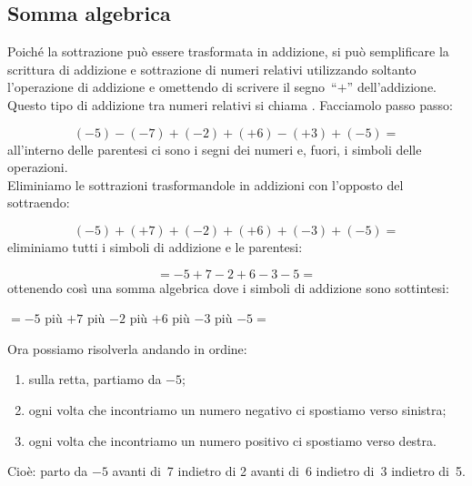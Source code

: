 \subsection{Somma algebrica}

Poiché la sottrazione può essere trasformata in addizione, si può 
semplificare la scrittura di addizione e sottrazione di numeri relativi 
utilizzando soltanto l'operazione di addizione e omettendo di scrivere
il segno~``\(+\)'' dell'addizione. 
Questo tipo di addizione tra numeri relativi si chiama .
Facciamolo passo passo:

\vspace{-1em}
\[(-5)-(-7)+(-2)+(+6)-(+3)+(-5) =\]
all'interno delle parentesi ci sono i segni dei numeri e, fuori, i simboli 
delle operazioni.\\
Eliminiamo le sottrazioni trasformandole in addizioni 
con l'opposto del sottraendo:

\vspace{-1em}
\[(-5)+(+7)+(-2)+(+6)+(-3)+(-5) =\]
eliminiamo tutti i simboli di addizione e le parentesi: 

\vspace{-1em}
\[=-5+7-2+6-3-5 =\]
ottenendo così una somma algebrica dove i simboli di addizione sono 
sottintesi: 

\vspace{-1em}
\begin{center}
\(= -5\) \quad più \quad \(+7\) \quad più \quad \(-2\) \quad più \quad 
\(+6\) \quad più \quad \(-3\) \quad più \quad \(-5 =\)\\
\end{center}

Ora possiamo risolverla andando in ordine:
\begin{enumerate} [nosep]
\item sulla retta, partiamo da \(-5\);
\item ogni volta che incontriamo un numero negativo ci spostiamo verso 
sinistra; 
\item ogni volta che incontriamo un numero positivo ci spostiamo verso 
destra.
\end{enumerate}

{\sommalgebrica}

Cioè: parto da \(-5\) avanti di~7 indietro di 2 avanti di~6 indietro 
di~3 indietro di~5.

